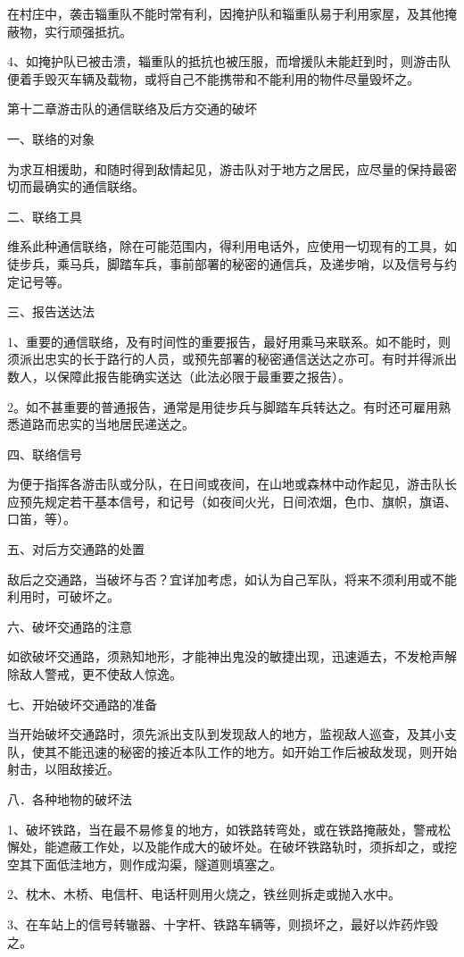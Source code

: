在村庄中，袭击辎重队不能时常有利，因掩护队和辎重队易于利用家屋，及其他掩蔽物，实行顽强抵抗。

4、如掩护队已被击溃，辎重队的抵抗也被压服，而增援队未能赶到时，则游击队便着手毁灭车辆及载物，或将自己不能携带和不能利用的物件尽量毁坏之。

第十二章游击队的通信联络及后方交通的破坏

一、联络的对象

为求互相援助，和随时得到敌情起见，游击队对于地方之居民，应尽量的保持最密切而最确实的通信联络。

二、联络工具

维系此种通信联络，除在可能范围内，得利用电话外，应使用一切现有的工具，如徒步兵，乘马兵，脚踏车兵，事前部署的秘密的通信兵，及递步哨，以及信号与约定记号等。

三、报告送达法

1、重要的通信联络，及有时间性的重要报告，最好用乘马来联系。如不能时，则须派出忠实的长于路行的人员，或预先部署的秘密通信送达之亦可。有时并得派出数人，以保障此报告能确实送达（此法必限于最重要之报告）。

2。如不甚重要的普通报告，通常是用徒步兵与脚踏车兵转达之。有时还可雇用熟悉道路而忠实的当地居民递送之。

四、联络信号

为便于指挥各游击队或分队，在日间或夜间，在山地或森林中动作起见，游击队长应预先规定若干基本信号，和记号（如夜间火光，日间浓烟，色巾、旗帜，旗语、口笛，等）。


五、对后方交通路的处置

敌后之交通路，当破坏与否？宜详加考虑，如认为自己军队，将来不须利用或不能利用时，可破坏之。

六、破坏交通路的注意

如欲破坏交通路，须熟知地形，才能神出鬼没的敏捷出现，迅速遁去，不发枪声解除敌人警戒，更不使敌人惊逸。

七、开始破坏交通路的准备

当开始破坏交通路时，须先派出支队到发现敌人的地方，监视敌人巡查，及其小支队，使其不能迅速的秘密的接近本队工作的地方。如开始工作后被敌发现，则开始射击，以阻敌接近。

八．各种地物的破坏法

1、破坏铁路，当在最不易修复的地方，如铁路转弯处，或在铁路掩蔽处，警戒松懈处，能遮蔽工作处，以及能作成大的破坏处。在破坏铁路轨时，须拆却之，或挖空其下面低洼地方，则作成沟渠，隧道则填塞之。

2、枕木、木桥、电信杆、电话杆则用火烧之，铁丝则拆走或抛入水中。

3、在车站上的信号转辙器、十字杆、铁路车辆等，则损坏之，最好以炸药炸毁之。

